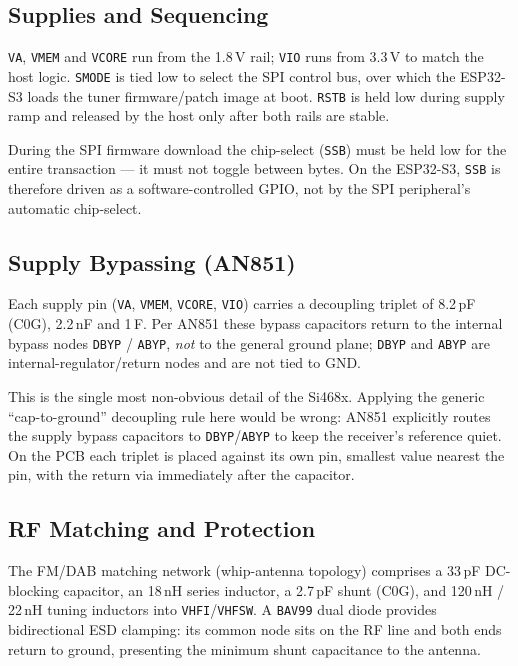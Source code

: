 \documentclass[11pt,a4paper]{report}
\newcommand{\ic}[1]{\texttt{#1}}
\begin{document}
\subsection{Supplies and Sequencing}
\ic{VA}, \ic{VMEM} and \ic{VCORE} run from the 1.8\,V rail; \ic{VIO} runs from 3.3\,V
to match the host logic. \ic{SMODE} is tied low to select the SPI control bus, over
which the ESP32-S3 loads the tuner firmware/patch image at boot. \ic{RSTB} is held
low during supply ramp and released by the host only after both rails are stable.

\begin{warnbox}
During the SPI firmware download the chip-select (\ic{SSB}) must be held low for the
entire transaction --- it must not toggle between bytes. On the ESP32-S3, \ic{SSB} is
therefore driven as a software-controlled GPIO, not by the SPI peripheral's automatic
chip-select.
\end{warnbox}

\subsection{Supply Bypassing (AN851)}
Each supply pin (\ic{VA}, \ic{VMEM}, \ic{VCORE}, \ic{VIO}) carries a decoupling
triplet of 8.2\,pF (C0G), 2.2\,nF and 1\,\textmu F. Per AN851 these bypass capacitors
return to the internal bypass nodes \ic{DBYP} / \ic{ABYP}, \emph{not} to the general
ground plane; \ic{DBYP} and \ic{ABYP} are internal-regulator/return nodes and are not
tied to GND.

\begin{designbox}
This is the single most non-obvious detail of the Si468x. Applying the generic
``cap-to-ground'' decoupling rule here would be wrong: AN851 explicitly routes the
supply bypass capacitors to \ic{DBYP}/\ic{ABYP} to keep the receiver's reference
quiet. On the PCB each triplet is placed against its own pin, smallest value nearest
the pin, with the return via immediately after the capacitor.
\end{designbox}

\subsection{RF Matching and Protection}
The FM/DAB matching network (whip-antenna topology) comprises a 33\,pF DC-blocking
capacitor, an 18\,nH series inductor, a 2.7\,pF shunt (C0G), and 120\,nH / 22\,nH
tuning inductors into \ic{VHFI}/\ic{VHFSW}. A \ic{BAV99} dual diode provides
bidirectional ESD clamping: its common node sits on the RF line and both ends return
to ground, presenting the minimum shunt capacitance to the antenna.
\end{document}
